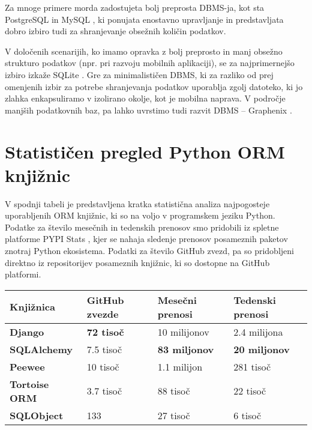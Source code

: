 \documentclass[a4paper,12pt,openright]{book}
\begin{document}
    Za mnoge primere morda zadostujeta bolj preprosta DBMS-ja, kot sta PostgreSQL \cite{POSTGRESQL} in MySQL \cite{MYSQL}, ki ponujata enostavno upravljanje in predstavljata dobro izbiro tudi za shranjevanje obsežnih količin podatkov. 
    
    V določenih scenarijih, ko imamo opravka z bolj preprosto in manj obsežno strukturo podatkov (npr. pri razvoju mobilnih aplikaciji), se za najprimernejšo izbiro izkaže SQLite \cite{SQLITE}. Gre za minimalističen DBMS, ki za razliko od prej omenjenih izbir za potrebe shranjevanja podatkov uporablja zgolj datoteko, ki jo zlahka enkapsuliramo v izolirano okolje, kot je mobilna naprava. V področje manjših podatkovnih baz, pa lahko uvrstimo tudi razvit DBMS – Graphenix \cite{GRAPHENIX_GITHUB}.
    
    \section{Statističen pregled Python ORM knjižnic}

    V spodnji tabeli je predstavljena kratka statistična analiza najpogosteje uporabljenih ORM knjižnic, ki so na voljo v programskem jeziku Python. Podatke za število mesečnih in tedenskih prenosov smo pridobili iz spletne platforme PYPI Stats \cite{pypistats}, kjer se nahaja sledenje prenosov posameznih paketov znotraj Python ekosistema. Podatki za število GitHub zvezd, pa so pridobljeni direktno iz repositorijev posameznih knjižnic, ki so dostopne na GitHub platformi.
    
    \noindent
    \begin{center}
        \begin{tabular}{p{}|p{}|p{}|p{}}
          {\bf Knjižnica} & {\bf GitHub zvezde} & {\bf Mesečni prenosi} & {\bf Tedenski prenosi} \\ \hline
          {\bf Django \cite{DJANGO_GITHUB}} & \textbf{\num{72} tisoč} & \num{10} milijonov & \num{2,4} milijona \\
          {\bf SQLAlchemy \cite{SQLALCHEMY_GITHUB}} & \num{7,5} tisoč &  \textbf{\num{83} miljonov} & \textbf{\num{20} miljonov} \\
          {\bf Peewee \cite{PEEWEE_GITHUB}} & \num{10} tisoč & \num{1,1} milijon & \num{281} tisoč \\
          {\bf Tortoise ORM \cite{TORTOISE_GITHUB}} & \num{3,7} tisoč & \num{88} tisoč & \num{22} tisoč \\
          {\bf SQLObject \cite{SQLOBJECT_GITHUB}} & 133 & \num{27} tisoč & \num{6} tisoč \\
        \end{tabular}
    \end{center}
    
\end{document}
